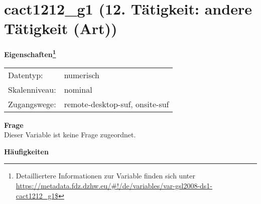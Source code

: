 
    \setcounter{footnote}{0}

    \vspace*{-1.8cm}
	\section{cact1212\_g1 (12. Tätigkeit: andere Tätigkeit (Art))}
	\label{section:cact1212_g1}



    \vspace*{0.5cm}
    \noindent\textbf{Eigenschaften\footnote{Detailliertere Informationen zur Variable finden sich unter
		\url{https://metadata.fdz.dzhw.eu/\#!/de/variables/var-gsl2008-ds1-cact1212_g1$}}}\\
	\begin{tabularx}{\hsize}{@{}lX}
	Datentyp: & numerisch \\
	Skalenniveau: & nominal \\
	Zugangswege: &
	  remote-desktop-suf, 
	  onsite-suf
 \\
    \end{tabularx}



		\vspace*{0.5cm}
		\noindent\textbf{Frage}\\
		Dieser Variable ist keine Frage zugeordnet.





        		\vspace*{0.5cm}
                \noindent\textbf{Häufigkeiten}

